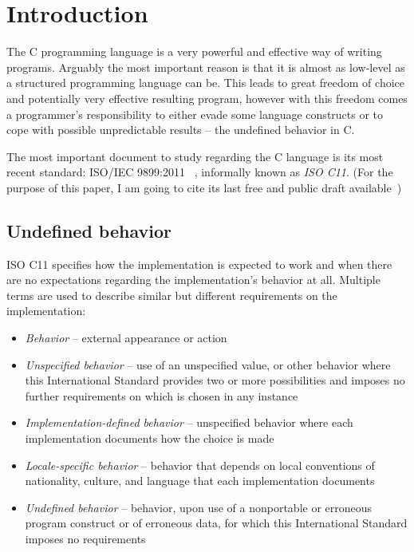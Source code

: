 
\chapter{Introduction}
The C programming language is a very powerful and effective way of writing programs. Arguably the most important reason is that it is almost as low-level as a structured programming language can be. This leads to great freedom of choice and potentially very effective resulting program, however with this freedom comes a programmer's responsibility to either evade some language constructs or to cope with possible unpredictable results -- the undefined behavior in C.

The most important document to study regarding the C language is its most recent standard: ISO/IEC 9899:2011~\cite{C11} , informally known as \emph{ISO C11}. (For the purpose of this paper, I am going to cite its last free and public draft available~\cite{WG14N1570})

\section{Undefined behavior}
ISO C11 specifies how the implementation is expected to work and when there are no expectations regarding the implementation's behavior at all. Multiple terms are used to describe similar but different requirements on the implementation:~\cite{WG14N1570}
\begin{itemize}
    \item \emph{Behavior} -- external  appearance or action
    \item \emph{Unspecified behavior} -- use of an unspecified value, or other behavior where this International Standard provides two or more possibilities and imposes no further requirements on which is chosen in any instance
    \item \emph{Implementation-defined behavior} -- unspecified behavior where each implementation documents how the choice is made
    \item \emph{Locale-specific behavior} -- behavior that depends on local conventions of nationality, culture, and language that each implementation documents
    \item \emph{Undefined behavior} -- behavior, upon use of a nonportable or erroneous program construct or of erroneous data, for which this International Standard imposes no requirements
\end{itemize}


